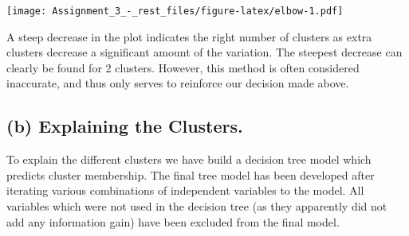 \documentclass[]{article}
\newenvironment{Shaded}{\begin{snugshade}}{\end{snugshade}}
\newcommand{\KeywordTok}[1]{\textcolor[rgb]{0.13,0.29,0.53}{\textbf{#1}}}
\newcommand{\DataTypeTok}[1]{\textcolor[rgb]{0.13,0.29,0.53}{#1}}
\newcommand{\DecValTok}[1]{\textcolor[rgb]{0.00,0.00,0.81}{#1}}
\newcommand{\StringTok}[1]{\textcolor[rgb]{0.31,0.60,0.02}{#1}}
\newcommand{\CommentTok}[1]{\textcolor[rgb]{0.56,0.35,0.01}{\textit{#1}}}
\newcommand{\ControlFlowTok}[1]{\textcolor[rgb]{0.13,0.29,0.53}{\textbf{#1}}}
\newcommand{\OperatorTok}[1]{\textcolor[rgb]{0.81,0.36,0.00}{\textbf{#1}}}
\newcommand{\NormalTok}[1]{#1}
\begin{document}
\begin{Shaded}
\end{Shaded}

\texttt{[image: Assignment\_3\_-\_rest\_files/figure-latex/elbow-1.pdf]}

A steep decrease in the plot indicates the right number of clusters as
extra clusters decrease a significant amount of the variation. The
steepest decrease can clearly be found for 2 clusters. However, this
method is often considered inaccurate, and thus only serves to reinforce
our decision made above.

\subsection{(b) Explaining the
Clusters.}\label{b-explaining-the-clusters.}

To explain the different clusters we have build a decision tree model
which predicts cluster membership. The final tree model has been
developed after iterating various combinations of independent variables
to the model. All variables which were not used in the decision tree (as
they apparently did not add any information gain) have been excluded
from the final model.
\end{document}
